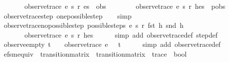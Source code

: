 \begin{isabellebody}
\ \ \ \ \ \ \ observe{\isacharunderscore}trace\ e\ s{\isacharprime}\ r{\isacharprime}\ es\ {\isacharequal}\ obs\ {\isasymLongrightarrow}\isanewline
\ \ \ \ \ \ \ observe{\isacharunderscore}trace\ e\ s\ r\ {\isacharparenleft}h{\isacharhash}es{\isacharparenright}\ {\isacharequal}\ p{\isacharhash}obs{\isachardoublequoteclose}\isanewline
%
\isadelimproof
\ \ %
\endisadelimproof
%
\isatagproof
{}\isamarkupfalse%
\ observe{\isacharunderscore}trace{\isacharunderscore}step\ one{\isacharunderscore}possible{\isacharunderscore}step\isanewline
\ \ \isamarkupfalse%
\ simp%
\endisatagproof
{\isafoldproof}%
%
\isadelimproof
\isanewline
%
\endisadelimproof
\isanewline
{}\isamarkupfalse%
\ observe{\isacharunderscore}trace{\isacharunderscore}no{\isacharunderscore}possible{\isacharunderscore}step{\isacharcolon}\ {\isachardoublequoteopen}possible{\isacharunderscore}steps\ e\ s\ r\ {\isacharparenleft}fst\ h{\isacharparenright}\ {\isacharparenleft}snd\ h{\isacharparenright}\ {\isacharequal}\ {\isacharbraceleft}{\isacharbar}{\isacharbar}{\isacharbraceright}\ {\isasymLongrightarrow}\isanewline
\ \ \ \ \ \ \ observe{\isacharunderscore}trace\ e\ s\ r\ {\isacharparenleft}h{\isacharhash}es{\isacharparenright}\ {\isacharequal}\ {\isacharbrackleft}{\isacharbrackright}{\isachardoublequoteclose}\isanewline
%
\isadelimproof
\ \ %
\endisadelimproof
%
\isatagproof
{}\isamarkupfalse%
\ {\isacharparenleft}simp\ add{\isacharcolon}\ observe{\isacharunderscore}trace{\isacharunderscore}def\ step{\isacharunderscore}def{\isacharparenright}%
\endisatagproof
{\isafoldproof}%
%
\isadelimproof
\isanewline
%
\endisadelimproof
\isanewline
{}\isamarkupfalse%
\ observe{\isacharunderscore}empty{\isacharcolon}\ {\isachardoublequoteopen}t\ {\isacharequal}\ {\isacharbrackleft}{\isacharbrackright}\ {\isasymLongrightarrow}\ observe{\isacharunderscore}trace\ e\ {}\ {\isacharless}{\isachargreater}\ t\ {\isacharequal}\ {\isacharbrackleft}{\isacharbrackright}{\isachardoublequoteclose}\isanewline
%
\isadelimproof
\ \ %
\endisadelimproof
%
\isatagproof
{}\isamarkupfalse%
\ {\isacharparenleft}simp\ add{\isacharcolon}\ observe{\isacharunderscore}trace{\isacharunderscore}def{\isacharparenright}%
\endisatagproof
{\isafoldproof}%
%
\isadelimproof
\isanewline
%
\endisadelimproof
\isanewline
{}\isamarkupfalse%
\ efsm{\isacharunderscore}equiv\ {\isacharcolon}{\isacharcolon}\ {\isachardoublequoteopen}transition{\isacharunderscore}matrix\ {\isasymRightarrow}\ transition{\isacharunderscore}matrix\ {\isasymRightarrow}\ trace\ {\isasymRightarrow}\ bool{\isachardoublequoteclose}\ \isanewline

\end{isabellebody}
